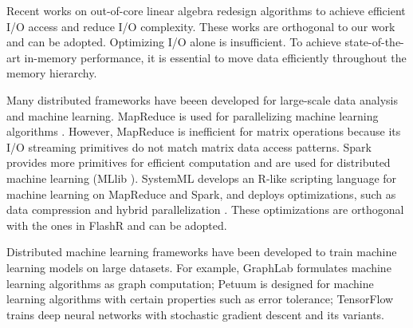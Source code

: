 
Recent works on out-of-core linear algebra \cite{Toledo99, Quintana-Orti12}
redesign algorithms to achieve efficient I/O access and reduce I/O
complexity. These works are orthogonal to our work and can be adopted.
Optimizing I/O alone is insufficient. To achieve state-of-the-art in-memory
performance, it is essential to move data efficiently throughout
the memory hierarchy.

Many distributed frameworks have beeen developed for large-scale data analysis
and machine learning. MapReduce \cite{mapreduce} is used for parallelizing
machine learning algorithms \cite{Chu06}.
However, MapReduce is inefficient
for matrix operations because its I/O streaming primitives do not match matrix
data access patterns. Spark \cite{spark} provides more primitives for efficient
computation and are used for distributed machine learning (MLlib \cite{mllib}).
SystemML \cite{systemml, systemml2} develops an R-like scripting language for
machine learning on MapReduce and Spark, and deploys optimizations,
such as data compression \cite{Elgohary16} and hybrid parallelization
\cite{Boehm14}. These optimizations are orthogonal with the ones in FlashR
and can be adopted.

Distributed machine learning frameworks have been developed to train machine
learning models on large datasets. For example, GraphLab \cite{graphlab}
formulates machine learning algorithms as graph computation; Petuum \cite{petuum}
is designed for machine learning algorithms with certain properties such as
error tolerance; TensorFlow \cite{tensorflow} trains deep neural networks
with stochastic gradient descent and its variants.

